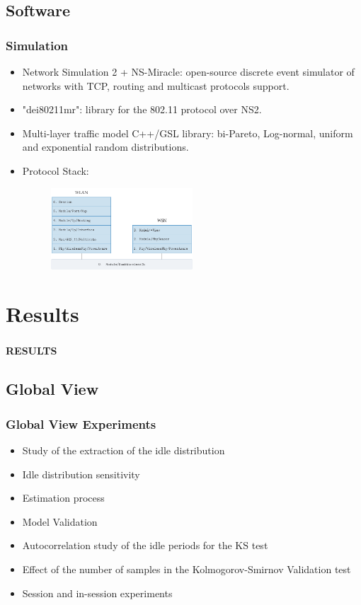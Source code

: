 \documentclass[9pt,handout,serif]{beamer}
\begin{document}
\subsection{Software}
\begin{frame}[c]
	\frametitle{Simulation}
	\begin{itemize}
		\item Network Simulation 2 + NS-Miracle: open-source discrete event simulator of networks with TCP, routing and multicast protocols support.
		\item "dei80211mr": library for the 802.11 protocol over NS2.
		\item Multi-layer traffic model C++/GSL library: bi-Pareto, Log-normal, uniform and exponential random distributions.
		\item Protocol Stack:
			\begin{figure}
				\includegraphics[width=0.5\textwidth]{../images/simulation/protocol_stack}
			\end{figure}
	\end{itemize}
\end{frame}

\section{Results}

\begin{frame}[c]
	\frametitle{}
	\begin{center}
		\textbf{\Huge{RESULTS}}
	\end{center}
\end{frame}

\subsection{Global View}
\begin{frame}[c]
	\frametitle{Global View Experiments}
	\begin{itemize}
		\item Study of the extraction of the idle distribution
		\item Idle distribution sensitivity
		\item Estimation process
		\item Model Validation
		\item Autocorrelation study of the idle periods for the KS test
		\item Effect of the number of samples in the Kolmogorov-Smirnov Validation test
		\item Session and in-session experiments
	\end{itemize}
\end{frame}
\end{document}
